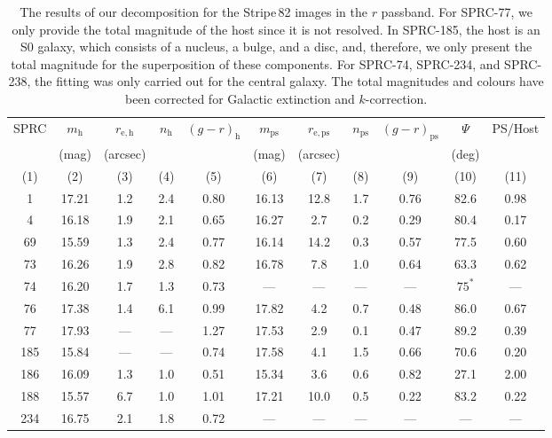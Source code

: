 \documentclass{raa}
\begin{document}
\begin{table}
\bc
\begin{minipage}[]{0.86\textwidth}
\caption[]{The results of our decomposition for the Stripe\,82 images in the $r$ passband. For SPRC-77, we only provide the total magnitude of the host since it is not resolved. In SPRC-185, the host is an S0 galaxy, which consists of a nucleus, a bulge, and a disc, and, therefore, we only present the total magnitude for the superposition of these components. For SPRC-74, SPRC-234, and SPRC-238, the fitting was only carried out for the central galaxy. The total magnitudes and colours have been corrected for Galactic extinction and $k$-correction.\label{tab:decomp_all_gals}}\end{minipage}
\setlength{\tabcolsep}{1pt}
\small
\begin{tabular}{ccccccccccc} 
 \hline\noalign{\smallskip}
SPRC &  $m_\mathrm{h}$ & $r_\mathrm{e,h}$ & $n_\mathrm{h}$ & $(g-r)_\mathrm{h}$ & $m_\mathrm{ps}$ & $r_\mathrm{e,ps}$ & $n_\mathrm{ps}$ & $(g-r)_\mathrm{ps}$ & $\Psi$ & PS/Host   \\ 
     &  (mag)          &    (arcsec)     &                &                    &   (mag)         &   (arcsec)       &  & &   (deg)  &  \\
  (1)     & (2)    & (3) & (4) & (5) & (6) & (7) & (8) & (9) & (10) & (11)  \\ 
\hline\noalign{\smallskip}
1 & 17.21 & 1.2 & 2.4 & 0.80 & 16.13 & 12.8 & 1.7 & 0.76 & 82.6 & 0.98\\
4 & 16.18 & 1.9 & 2.1 & 0.65 & 16.27 & 2.7 & 0.2 & 0.29 & 80.4 & 0.17\\
69 & 15.59 & 1.3 & 2.4 & 0.77 & 16.14 & 14.2 & 0.3 & 0.57 & 77.5 & 0.60\\
73 & 16.26 & 1.9 & 2.8 & 0.82 & 16.78 & 7.8 & 1.0 & 0.64 & 63.3 & 0.62\\
74 & 16.20 & 1.7 & 1.3 & 0.73 & --- & --- & --- & --- & $75^{*}$ & ---\\
76 & 17.38 & 1.4 & 6.1 & 0.99 & 17.82 & 4.2 & 0.7 & 0.48 & 86.0 & 0.67\\
77 & 17.93 & --- & --- & 1.27 & 17.53 & 2.9 & 0.1 & 0.47 & 89.2 & 0.39\\
185 & 15.84 & --- & --- & 0.74 & 17.58 & 4.1 & 1.5 & 0.66 & 70.6 & 0.20\\
186 & 16.09 & 1.3 & 1.0 & 0.51 & 15.34 & 3.6 & 0.6 & 0.82 & 27.1 & 2.00\\
188 & 15.57 & 6.7 & 1.0 & 1.01 & 17.21 & 10.0 & 0.5 & 0.22 & 83.2 & 0.22\\
234 & 16.75 & 2.1 & 1.8 & 0.72 & --- & --- & --- & --- & --- & ---\\

\end{tabular}
\end{table}
\end{document}
